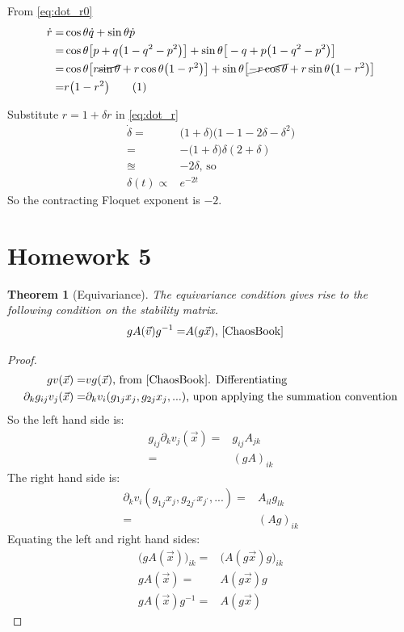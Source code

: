 \documentclass[]{article}
\newcommand\numberthis{\addtocounter{equation}{1}\tag{\theequation}}
\newtheorem{thm}{Theorem}
\begin{document}
From \eqref{eq:dot_r0}
\begin{align*}
	\dot{r} =&	\cos{\theta} \dot{q} + \sin{\theta} \dot{p}\\
	=& 	\cos{\theta} \big[p + q\big(1-q^2-p^2\big)\big] + \sin{\theta} \big[-q + p\big(1-q^2-p^2\big)\big]\\
	=& 	\cos{\theta} \big[r \cancel{\sin{\theta}} + r \cos{\theta}\big(1-r^2\big)\big] + \sin{\theta} \big[\cancel{-r \cos{\theta}} + r \sin{\theta}\big(1-r^2\big)\big]\\
	=& r \big(1-r^2\big) \numberthis \label{eq:dot_r}
\end{align*}

Substitute $r=1+\delta r$ in \eqref{eq:dot_r}
\begin{align*}
	\dot{\delta} =& \big(1+\delta\big)\big(1 -1 -2 \delta - \delta^2\big)\\
	=& - \big(1+\delta\big) \delta (2 + \delta)\\
	\approxeq & - 2 \delta \text{, so}\\
	\delta(t) \propto & e^{-2 t}
\end{align*}
So the contracting Floquet exponent is $-2$.

\section{Homework 5}
\begin{thm}[Equivariance] 
	The equivariance condition \cite[(12.1)]{ChaosBook} gives rise to the following condition on the stability matrix.
	\begin{align*}
		g A(\vec{v}) g^{-1} =& A(g \vec{x}) \text{, \cite[(12.25)]{ChaosBook}}
	\end{align*}
\end{thm}

\begin{proof}
	\begin{align*}
		g v(\vec{x})=& v{g(\vec{x})} \text{, from \cite[(12.1)]{ChaosBook}. Differentiating}\\
		\partial_k g_{ij} v_j(\vec{x})=& \partial_k v_i (g_{1j} x_j, g_{2j} x_j,... ) \text{, upon applying the summation convention}
	\end{align*}
	So the left hand side is:
	\begin{align*}
		g_{ij} \partial_k v_j(\vec{x})=& g_{ij}A_{jk}\\
		=& (gA)_{ik}
	\end{align*}
	The right hand side is:
	\begin{align*}
		\partial_k v_i (g_{1j} x_j, g_{2j{^\prime}} x_{j{^\prime}},... ) =& A_{il} g_{lk}\\
		=&(Ag)_{ik}
	\end{align*}
	Equating the left and right hand sides:
	\begin{align*}
		\big(gA(\vec{x})\big)_{ik} =& \big(A(g \vec{x})g\big)_{ik}\\
		gA(\vec{x}) =& A(g \vec{x})g\\
		gA(\vec{x})g^{-1} =& A(g \vec{x})
	\end{align*}
\end{proof}
\end{document}
